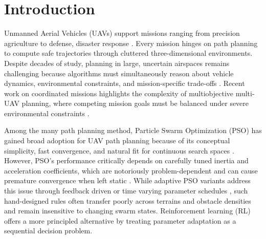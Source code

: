 \documentclass[final,5p,times]{elsarticle}
\begin{document}
\section{Introduction}
\label{sec:intro}
Unmanned Aerial Vehicles (UAVs) support missions ranging from precision agriculture to defense, disaster response \cite{Delavarpour2021A, Fascista2022Toward, Alotaibi2019LSAR}.
Every mission hinges on path planning to compute safe trajectories through cluttered three-dimensional environments.
Despite decades of study, planning in large, uncertain airspaces remains challenging because algorithms must simultaneously reason about vehicle dynamics, environmental constraints, and mission-specific trade-offs \cite{AitSaadi2022UAV, Zhou2025A}.
Recent work on coordinated missions highlights the complexity of multiobjective multi-UAV planning, where competing mission goals must be balanced under severe environmental constraints \cite{Meng2025Multiobjective}.

Among the many path planning method, Particle Swarm Optimization (PSO) \cite{Kennedy1995Particle} has gained broad adoption for UAV path planning because of its conceptual simplicity, fast convergence, and natural fit for continuous search spaces \cite{Cheng2024Research}.
However, PSO's performance critically depends on carefully tuned inertia and acceleration coefficients, which are notoriously problem-dependent and can cause premature convergence when left static \cite{Yang2015Lowdiscrepancy}.
While adaptive PSO variants address this issue through feedback driven or time varying parameter schedules \cite{Bansal2011Inertia, Liu2025A}, such hand-designed rules often transfer poorly across terrains and obstacle densities and remain insensitive to changing swarm states.
Reinforcement learning (RL) offers a more principled alternative by treating parameter adaptation as a sequential decision problem.
\end{document}
